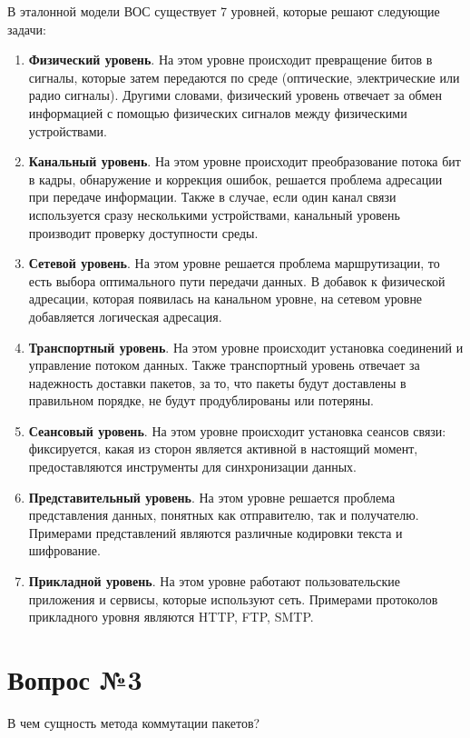 \documentclass[a4paper, 14pt]{extarticle}
\begin{document}
В эталонной модели ВОС существует 7 уровней, которые решают следующие задачи:
\begin{enumerate}[leftmargin=0pt]
  \item \textbf{Физический уровень}. На этом уровне происходит превращение битов
  в сигналы, которые затем передаются по среде (оптические, электрические или
  радио сигналы). Другими словами, физический уровень отвечает за обмен
  информацией с помощью физических сигналов между физическими устройствами.
  \item \textbf{Канальный уровень}. На этом уровне происходит преобразование
  потока бит в кадры, обнаружение и коррекция ошибок, решается проблема
  адресации при передаче информации. Также в случае, если один канал связи
  используется сразу несколькими устройствами, канальный уровень производит
  проверку доступности среды.
  \item \textbf{Сетевой уровень}. На этом уровне решается проблема
  маршрутизации, то есть выбора оптимального пути передачи данных. В добавок к
  физической адресации, которая появилась на канальном уровне, на сетевом уровне
  добавляется логическая адресация.
  \item \textbf{Транспортный уровень}. На этом уровне происходит установка
  соединений и управление потоком данных. Также транспортный уровень отвечает за
  надежность доставки пакетов, за то, что пакеты будут доставлены в правильном
  порядке, не будут продублированы или потеряны.
  \item \textbf{Сеансовый уровень}. На этом уровне происходит установка сеансов
  связи: фиксируется, какая из сторон является активной в настоящий момент,
  предоставляются инструменты для синхронизации данных.
  \item \textbf{Представительный уровень}. На этом уровне решается проблема
  представления данных, понятных как отправителю, так и получателю. Примерами
  представлений являются различные кодировки текста и шифрование.
  \item \textbf{Прикладной уровень}. На этом уровне работают пользовательские
  приложения и сервисы, которые используют сеть. Примерами протоколов
  прикладного уровня являются HTTP, FTP, SMTP.
\end{enumerate}

\section*{Вопрос №3}

\begin{siderules}
  В чем сущность метода коммутации пакетов?
\end{siderules}
\end{document}
